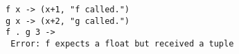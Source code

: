 \begin{verbatim}
f x -> (x+1, "f called.")
g x -> (x+2, "g called.")
f . g 3 ->
 Error: f expects a float but received a tuple
\end{verbatim}
